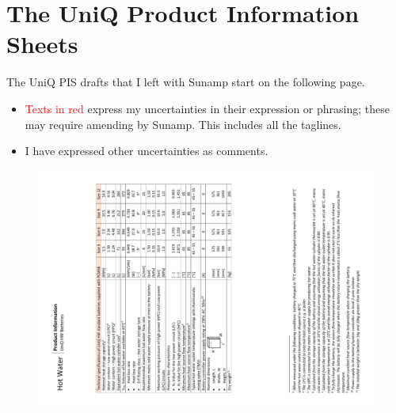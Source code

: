 
\chapter{The UniQ Product Information Sheets} %

\label{App:PISs} %


The UniQ PIS drafts that I left with Sunamp start on the following page.

\begin{itemize}
    \item \textcolor{red}{Texts in red} express my uncertainties in their expression or phrasing; these may require amending by Sunamp. This includes all the taglines.
    \item I have expressed other uncertainties as comments.
\end{itemize}



%

%

\newpage
\begin{figure}
	\centering
	\includegraphics[height=0.48\textheight]{Appendices/1_PIS_HW_02.png}
\end{figure}


